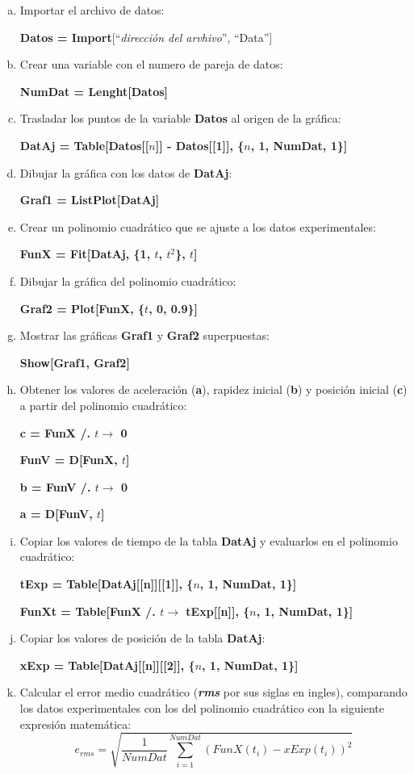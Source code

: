 \documentclass[12pt, titlepage]{report}
\begin{document}
    \begin{enumerate}[a), topsep=0.5cm]
        \item Importar el archivo de datos:
        
        \centerline{\textbf{Datos = Import}[``\textit{dirección del arvhivo}'', ``Data'']}
        \item Crear una variable con el numero de pareja de datos: 
        
        \centerline{\textbf{NumDat = Lenght[Datos]}}
        \item Trasladar los puntos de la variable \textbf{Datos} al origen de la gráfica:
    
        \centerline{\textbf{DatAj = Table[Datos[[$n$]] - Datos[[1]], \{$n$, 1, NumDat, 1\}]}}
        \item Dibujar la gráfica con los datos de \textbf{DatAj}:
        
        \centerline{\textbf{Graf1 = ListPlot[DatAj]}}
        \item Crear un polinomio cuadrático que se ajuste a los datos experimentales: 
        
        \centerline{\textbf{FunX = Fit[DatAj, \{1, $t$, $t^2$\}, $t$]}}
        \item Dibujar la gráfica del polinomio cuadrático: 
        
        \centerline{\textbf{Graf2 = Plot[FunX, \{$t$, 0, 0.9\}]}}
        \newpage
        \item Mostrar las gráficas \textbf{Graf1} y \textbf{Graf2} superpuestas:
        
        \centerline{\textbf{Show[Graf1, Graf2]}}
        \item Obtener los valores de aceleración (\textbf{a}), rapidez inicial (\textbf{b}) y posición inicial (\textbf{c}) a partir del polinomio cuadrático:
        
        \centerline{\textbf{c = FunX /. $t \rightarrow$ 0}}
        \centerline{\textbf{FunV = D[FunX, $t$]}}
        \centerline{\textbf{b = FunV /. $t \rightarrow$ 0}}
        \centerline{\textbf{a = D[FunV, $t$]}}
        \item Copiar los valores de tiempo de la tabla \textbf{DatAj} y evaluarlos en el polinomio cuadrático:
        
        \centerline{\textbf{tExp = Table[DatAj[[n]][[1]], \{$n$, 1, NumDat, 1\}]}}
        \centerline{\textbf{FunXt = Table[FunX /. $t \rightarrow$ tExp[[n]], \{$n$, 1, NumDat, 1\}]}}
        \item Copiar los valores de posición de la tabla \textbf{DatAj}:
        
        \centerline{\textbf{xExp = Table[DatAj[[n]][[2]], \{$n$, 1, NumDat, 1\}]}}
        \item Calcular el error medio cuadrático (\textit{\textbf{rms}} por sus siglas en ingles), comparando los datos experimentales con los del polinomio cuadrático con la siguiente expresión matemática:
        $$e_{rms}=\sqrt{\frac{1}{NumDat} \sum_{i=1}^{NumDat}(FunX(t_i)-xExp(t_i))^2}$$
    \end{enumerate}
\end{document}
